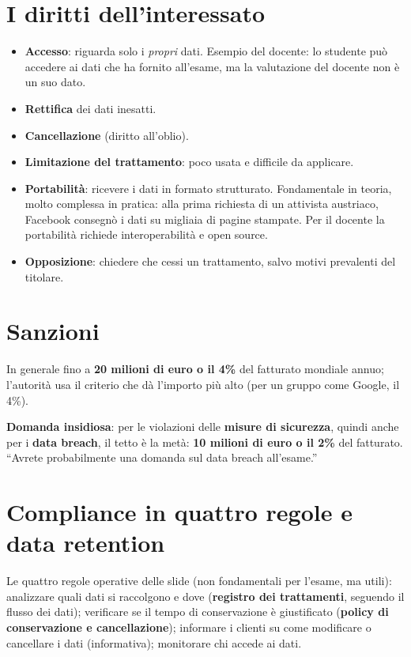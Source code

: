 \section{I diritti dell'interessato}
\begin{itemize}
  \item \textbf{Accesso}: riguarda solo i \emph{propri} dati. Esempio del docente: lo studente può
    accedere ai dati che ha fornito all'esame, ma la valutazione del docente non è un suo dato.
  \item \textbf{Rettifica} dei dati inesatti.
  \item \textbf{Cancellazione} (diritto all'oblio).
  \item \textbf{Limitazione del trattamento}: poco usata e difficile da applicare.
  \item \textbf{Portabilità}: ricevere i dati in formato strutturato. Fondamentale in teoria, molto
    complessa in pratica: alla prima richiesta di un attivista austriaco, Facebook consegnò i dati su
    migliaia di pagine stampate. Per il docente la portabilità richiede interoperabilità e open
    source.
  \item \textbf{Opposizione}: chiedere che cessi un trattamento, salvo motivi prevalenti del titolare.
\end{itemize}

\section{Sanzioni}
In generale fino a \textbf{20 milioni di euro o il 4\%} del fatturato mondiale annuo; l'autorità
usa il criterio che dà l'importo più alto (per un gruppo come Google, il 4\%).

\begin{esame}
\textbf{Domanda insidiosa}: per le violazioni delle \textbf{misure di sicurezza}, quindi anche per i
\textbf{data breach}, il tetto è la metà: \textbf{10 milioni di euro o il 2\%} del fatturato. ``Avrete
probabilmente una domanda sul data breach all'esame.''
\end{esame}

\section{Compliance in quattro regole e data retention}
Le quattro regole operative delle slide (non fondamentali per l'esame, ma utili): analizzare quali dati
si raccolgono e dove (\textbf{registro dei trattamenti}, seguendo il flusso dei dati); verificare se il
tempo di conservazione è giustificato (\textbf{policy di conservazione e cancellazione}); informare i
clienti su come modificare o cancellare i dati (informativa); monitorare chi accede ai dati.

